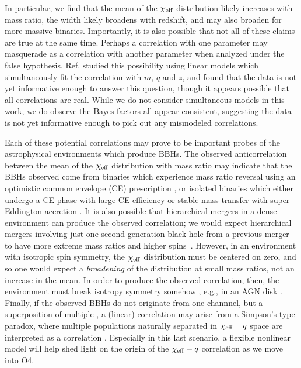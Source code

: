 \documentclass[%
 reprint,
 amsmath,amssymb,
 aps,
 prd,
]{revtex4-2}
\newcommand{\chieff}{\chi_{\rm eff}}
\begin{document}
In particular, we find that the mean of the $\chieff$ distribution likely increases with mass ratio, the width likely broadens with redshift, and may also broaden for more massive binaries. Importantly, it is also possible that not all of these claims are true at the same time. Perhaps a correlation with one parameter may masquerade as a correlation with another parameter when analyzed under the false hypothesis. Ref. \cite{Biscoveanu:2022qac} studied this possibility using linear models which simultaneously fit the correlation with $m$, $q$ and $z$, and found that the data is not yet informative enough to answer this question, though it appears possible that all correlations are real. While we do not consider simultaneous models in this work, we do observe the Bayes factors all appear consistent, suggesting the data is not yet informative enough to pick out any mismodeled correlations.
 

Each of these potential correlations may prove to be important probes of the astrophysical environments which produce BBHs. The observed anticorrelation between the mean of the $\chieff$ distribution with mass ratio may indicate that the BBHs observed come from binaries which experience mass ratio reversal using an optimistic common envelope (CE) prescription \cite{Broekgaarden:2022nst}, or isolated binaries which either undergo a CE phase with large CE efficiency or stable mass transfer with super-Eddington accretion \cite{Bavera:2020uch, Zevin:2022wrw}. It is also possible that hierarchical mergers in a dense environment can produce the observed correlation; we would expect hierarchical mergers involving just one second-generation black hole from a previous merger to have more extreme mass ratios and higher spins~\cite[e.g.,][]{Gerosa:2021mno}. However, in an environment with isotropic spin symmetry, the $\chieff$ distribution must be centered on zero, and so one would expect a \textit{broadening} of the distribution at small mass ratios, not an increase in the mean. In order to produce the observed correlation, then, the environment must break isotropy symmetry somehow \cite{Santini:2023ukl}, e.g., in an AGN disk \cite{McKernan:2021nwk, Santini:2023ukl}. Finally, if the observed BBHs do not originate from one channnel, but a superposition of multiple \cite[e.g.,][]{Zevin:2020gbd,Cheng:2023ddt}, a (linear) correlation may arise from a Simpson's-type paradox, where multiple populations naturally separated in $\chieff-q$ space are %
interpreted as a correlation \cite{Baibhav:2022qxm}. Especially in this last scenario, a flexible nonlinear model will help shed light on the origin of the $\chieff-q$ correlation as we move into O4. 
\end{document}
